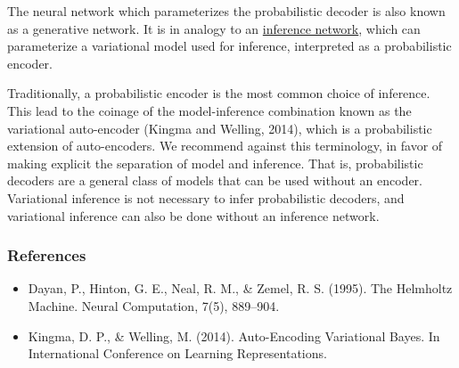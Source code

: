 The neural network which parameterizes the probabilistic decoder is
also known as a generative network. It is in analogy to an
\href{tut_inference_networks.html}{inference network}, which
can parameterize a variational model used for inference,
interpreted as a probabilistic encoder.

Traditionally, a probabilistic encoder is the most common
choice of inference. This lead to the coinage of the model-inference
combination known as the variational auto-encoder
(Kingma and Welling, 2014), which is a probabilistic extension of
auto-encoders.
We recommend against this terminology,
in favor of making explicit the separation of model and inference.
That is, probabilistic decoders are a general class of
models that can be used without an encoder.
Variational
inference is not necessary to infer probabilistic decoders, and
variational inference can also be done without an inference network.

\subsubsection{References}\label{references}

\begin{itemize}
\item
  Dayan, P., Hinton, G. E., Neal, R. M., & Zemel, R. S. (1995). The Helmholtz Machine. Neural Computation, 7(5), 889–904.
\item
  Kingma, D. P., & Welling, M. (2014). Auto-Encoding Variational Bayes. In International Conference on Learning Representations.
\end{itemize}

